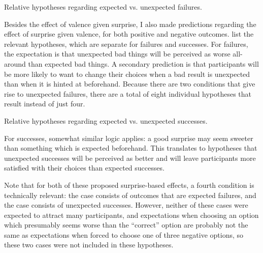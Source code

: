 \begin{table}[!h]
\centering
\bgroup
\def\arraystretch{1.3}
\setlength{\tabcolsep}{0.6em}

\egroup
\caption[Retrospective expected vs\@. unexpected failure hypotheses]{Relative hypotheses regarding expected vs\@. unexpected failures.}
\label{tab:e2-expected-vs-unexpected-failure-hypotheses}
\end{table}

Besides the effect of valence given surprise, I also made predictions regarding the effect of surprise given valence, for both positive and negative outcomes.
%
 list the relevant hypotheses, which are separate for failures and successes.
%
For failures, the expectation is that unexpected bad things will be perceived as worse all-around than expected bad things.
%
A secondary prediction is that participants will be more likely to want to change their choices when a bad result is unexpected than when it is hinted at beforehand.
%
Because there are two conditions that give rise to unexpected failures, there are a total of eight individual hypotheses that result instead of just four.

\begin{table}[!h]
\centering
\bgroup
\def\arraystretch{1.3}
\setlength{\tabcolsep}{0.6em}

\egroup
\caption[Retrospective expected vs\@. unexpected success hypotheses]{Relative hypotheses regarding expected vs\@. unexpected successes.}
\label{tab:e2-expected-vs-unexpected-success-hypotheses}
\end{table}

For successes, somewhat similar logic applies: a good surprise may seem sweeter than something which is expected beforehand.
%
This translates to hypotheses that unexpected successes will be perceived as better and will leave participants more satisfied with their choices than expected successes.


Note that for both of these proposed surprise-based effects, a fourth condition is technically relevant: the \obvsa{} case consists of outcomes that are expected failures, and the \obvfa{} case consists of unexpected successes.
%
However, neither of these cases were expected to attract many participants, and expectations when choosing an option which presumably seems worse than the ``correct'' option are probably not the same as expectations when forced to choose one of three negative options, so these two cases were not included in these hypotheses.


